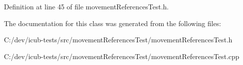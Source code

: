 Definition at line 45 of file movement\+References\+Test.\+h.



The documentation for this class was generated from the following files\+:\begin{DoxyCompactItemize}
\item 
C\+:/dev/icub-\/tests/src/movement\+References\+Test/movement\+References\+Test.\+h\item 
C\+:/dev/icub-\/tests/src/movement\+References\+Test/movement\+References\+Test.\+cpp\end{DoxyCompactItemize}
